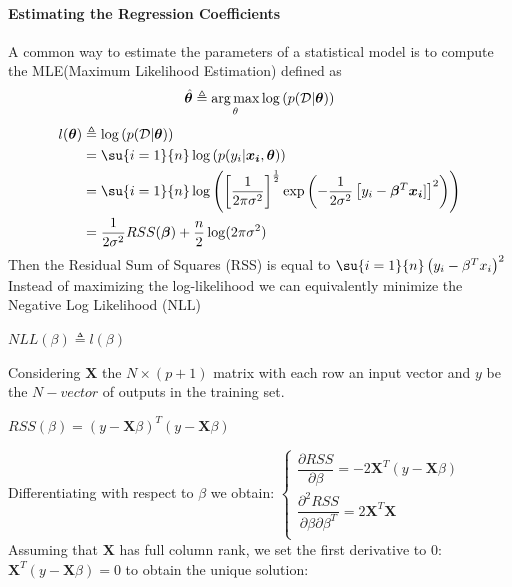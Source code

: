 \paragraph{Estimating the Regression Coefficients}
A common way to estimate the parameters of a statistical model is to compute
the MLE(Maximum Likelihood Estimation) defined as 
$$\hat{\bm{\theta}} \triangleq \displaystyle \operatorname*{arg\,max}_{\theta} \log\left(
p(\mathcal{D}|\bm{\theta})\right)$$
\begin{align*}
    l(\bm{\theta}) &\triangleq \log\left(p(\mathcal{D}|\bm{\theta})\right)\\
                   &=\su{i=1}{n}\log\left(p(y_{i}|\bm{x_{i}}, \bm{\theta})\right)\\
                   &= \su{i=1}{n}\log\left(
                       \left[\dfrac{1}{2\pi\sigma^{2}}\right]^{\frac{1}{2}}
                       \exp\left(-\dfrac{1}{2\sigma^{2}}\left[y_{i} - \bm{\beta}^{T}
                       \bm{x_{i}}]\right]^{2}\right)\right)\\ 
                   &= \dfrac{1}{2\sigma^{2}}RSS(\bm{\beta}) +
                   \dfrac{n}{2}\log(2\pi\sigma^{2})
\end{align*}
Then the Residual Sum of Squares (RSS) is equal to $\su{i=1}{n}\left(
y_{i}-\beta^{T}x_{i}\right)^{2}$
Instead of maximizing the log-likelihood we can equivalently minimize the Negative Log Likelihood (NLL) 
\begin{center}
    $NLL(\beta) \triangleq l(\beta)$
\end{center}


Considering $\bm{X}$ the $N\times (p+1)$ matrix with each row an input
vector and $y$ be the $N-vector$ of outputs in the training set.
\begin{center}
	$RSS(\beta)=(y-\bm{X}\beta)^{T}(y-\bm{X}\beta)$
\end{center}
Differentiating with respect to $\beta$ we obtain:
$
\begin{cases}
	\dfrac{\partial RSS}{\partial\beta}=-2\bm{X}^{T}(y-\bm{X}\beta)\\
	\dfrac{\partial^{2} RSS}{\partial\beta\partial\beta^{T}}=2\bm{X}^{T}\bm{X}\\
\end{cases}
$\\
Assuming that $\bm{X}$ has full column rank, we set the first 
derivative to 0:\\ $\bm{X}^{T}(y-\bm{X}\beta)=0$ to obtain the unique
solution:

